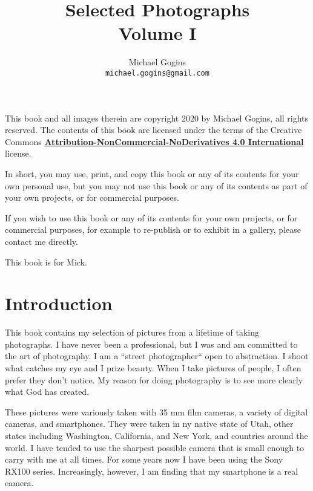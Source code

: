 \documentclass[10pt,letter,oneside]{book}
\begin{document}
\frontmatter
\title{Selected Photographs\\Volume I}
\author{Michael Gogins \\ \texttt{michael.gogins@gmail.com}}

\maketitle

\newpage
\noindent This book and all images therein are copyright 2020 by Michael Gogins, all rights reserved. The contents of this book are licensed under the terms of the Creative Commons \href{https://creativecommons.org/licenses/by-nc-nd/4.0/legalcode}{\textbf{Attribution-NonCommercial-NoDerivatives 4.0 International} } license. 

In short, you may use, print, and copy this book or any of its contents for your own personal use, but you may not use this book or any of its contents as part of your own projects, or for commercial purposes.

If you wish to use this book or any of its contents for your own projects, or for commercial purposes, for example to re-publish or to exhibit in a gallery, please contact me directly.

\newpage
\begin{centering}
This book is for Mick.
\end{centering}

\tableofcontents

\mainmatter
\pagestyle{headings}

\chapter{Introduction}

This book contains my selection of pictures from a lifetime of taking photographs. I have never been a professional, but I was and am committed to the art of photography. I am a ``street photographer`` open to abstraction. I shoot what catches my eye and I prize beauty. When I take pictures of people, I often prefer they don't notice. My reason for doing photography is to see more clearly what God has created.

These pictures were variously taken with 35 mm film cameras, a variety of digital cameras, and smartphones. They were taken in ny native state of Utah, other states including Washington, California, and New York, and countries around the world. I have tended to use the sharpest possible camera that is small enough to carry with me at all times. For some years now I have been using the Sony RX100 series. Increasingly, however, I am finding that my smartphone is a real camera.
\end{document}
